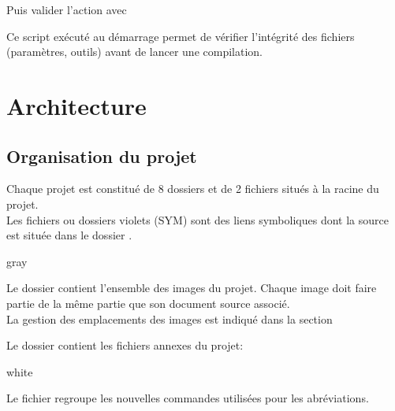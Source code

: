 {Puis valider l'action avec 


Ce script exécuté au démarrage permet de vérifier l'intégrité des fichiers (paramètres, outils) avant de lancer une compilation.\chapter{Architecture}

\section{Organisation du projet}

 
Chaque projet est constitué de 8 dossiers et de 2 fichiers situés à la racine du projet.\\
Les fichiers ou dossiers violets (SYM) sont des liens symboliques dont la source est située dans le dossier .


    \begin{items}{gray}{\faFolder}
    \item Le dossier  contient l'ensemble des images du projet.
    Chaque image doit faire partie de la même partie que son document source associé.\\

    La gestion des emplacements des images est indiqué dans la section \\

    \item Le dossier  contient les fichiers annexes du projet: 
    \begin{items}{white}{}
        \item Le fichier  regroupe les nouvelles commandes utilisées pour les abréviations.


\end{items}
\end{items}}
